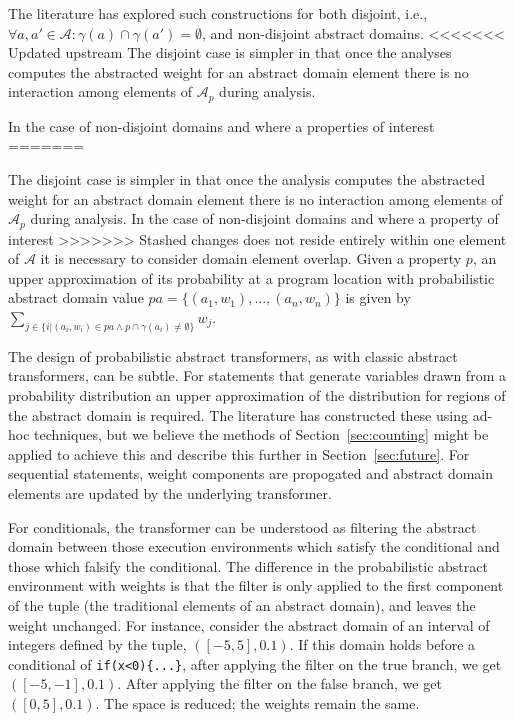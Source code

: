 The literature has explored such constructions for both
disjoint, i.e., $\forall a,a' \in \mathcal{A} : 
\gamma(a) \cap \gamma(a') = \emptyset$, and non-disjoint abstract domains.
<<<<<<< Updated upstream
The disjoint case is simpler in that once the analyses computes
the abstracted weight for an abstract domain element there is
no interaction among elements of $\mathcal{A}_p$ during analysis.

In the case of non-disjoint domains and where a properties of interest
=======

The disjoint case is simpler in that once the analysis computes
the abstracted weight for an abstract domain element there is
no interaction among elements of $\mathcal{A}_p$ during analysis.
In the case of non-disjoint domains and where a property of interest
>>>>>>> Stashed changes
does not reside entirely within one element of $\mathcal{A}$ it is
necessary to consider domain element overlap. 
Given a property $p$, an upper approximation of its probability 
at a program location with probabilistic abstract domain
value $pa = \{(a_1,w_1), ..., (a_n,w_n)\}$
is given by $\sum_{j \in \{ i \vert (a_i,w_i) \in pa \wedge   
p \cap \gamma(a_i) \not= \emptyset\}} w_j$.

The design of probabilistic abstract transformers, as with 
classic abstract transformers, can be subtle.
For statements that generate variables drawn from a probability
distribution an upper approximation of the distribution for
regions of the abstract domain is required.  The literature
has constructed these using ad-hoc techniques, but we believe
the methods of Section~\ref{sec:counting} might be applied to 
achieve this and describe this further in Section~\ref{sec:future}.
For sequential statements, weight components are propogated
and abstract domain elements are updated by the underlying transformer.

For conditionals, the transformer can be understood
as filtering the abstract domain between those execution environments which
satisfy the conditional and those which falsify the conditional. 
The difference in the probabilistic abstract environment with weights 
is that the filter is only applied to the first component of
the tuple (the traditional elements of an abstract domain), 
and leaves the weight unchanged.
For instance, consider the abstract domain of an interval of 
integers defined by the tuple, $([-5,5],0.1)$. 
If this domain holds before a conditional of 
{\tt if(x<0)\{...\}}, after applying the filter on the true branch, 
we get $([-5,-1],0.1)$. 
After applying the filter on the false branch, we get $([0,5],0.1)$.
The space is reduced; the weights remain the same.

